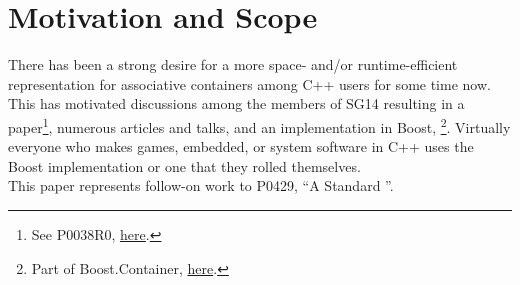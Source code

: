\section{Motivation and Scope}

There has been a strong desire for a more space- and/or runtime-efficient
representation for associative containers among C++ users for some time now.
This has motivated discussions among the members of SG14 resulting in a
paper\footnote{See P0038R0,
  \href{http://www.open-std.org/jtc1/sc22/wg21/docs/papers/2015/p0038r0.html}{here}.},
numerous articles and talks, and an implementation in Boost,
\footnote{Part of Boost.Container,
  \href{http://www.boost.org/doc/libs/1_61_0/doc/html/container.html}{here}.}.
Virtually everyone who makes games, embedded, or system software in C++ uses
the Boost implementation or one that they rolled themselves.\\

This paper represents follow-on work to P0429, ``A Standard ''.\\
